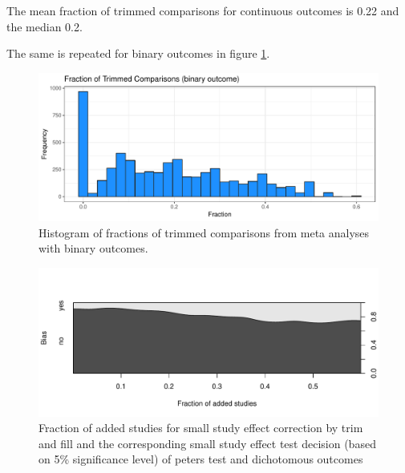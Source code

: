 \documentclass[11pt,a4paper,twoside]{book}\usepackage[]{graphicx}\usepackage[]{color}
\newenvironment{knitrout}{}{} %
\begin{document}
The mean fraction of trimmed comparisons for continuous outcomes is 0.22 and the median 0.2.

The same is repeated for binary outcomes in figure \ref{trimfill.bin}. 
\begin{figure}
\begin{knitrout}
\color{fgcolor}

{\centering \includegraphics[width=\textwidth-3cm]{figure/ch02_figunnamed-chunk-26-1} 

}



\end{knitrout}
\caption{Histogram of fractions of trimmed comparisons from meta analyses with binary outcomes.}
\label{trimfill.bin}
\end{figure}


\begin{figure}
\begin{knitrout}
\color{fgcolor}

{\centering \includegraphics[width=\textwidth-3cm]{figure/ch02_figunnamed-chunk-27-1} 

}



\end{knitrout}
\caption{Fraction of added studies for small study effect correction by trim and fill and the corresponding small study effect test decision (based on 5\% significance level) of peters test and dichotomous outcomes}
\label{trimfill.pvalues.bin}
\end{figure}
\end{document}
